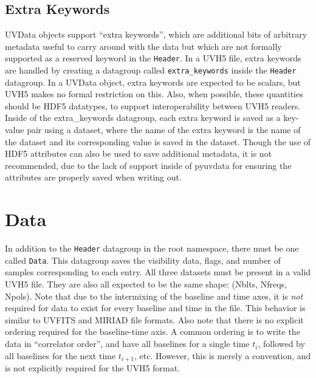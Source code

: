 \documentclass[11pt, oneside]{article}
\begin{document}
\subsection{Extra Keywords}
\label{sec:extra_keywords}
UVData objects support ``extra keywords'', which are additional bits of
arbitrary metadata useful to carry around with the data but which are not
formally supported as a reserved keyword in the \verb+Header+. In a UVH5 file,
extra keywords are handled by creating a datagroup called \verb+extra_keywords+
inside the \verb+Header+ datagroup. In a UVData object, extra keywords are
expected to be scalars, but UVH5 makes no formal restriction on this. Also, when
possible, these quantities should be HDF5 datatypes, to support interoperability
between UVH5 readers. Inside of the extra\_keywords datagroup, each extra
keyword is saved as a key-value pair using a dataset, where the name of the
extra keyword is the name of the dataset and its corresponding value is saved in
the dataset. Though the use of HDF5 attributes can also be used to save
additional metadata, it is not recommended, due to the lack of support inside of
pyuvdata for ensuring the attributes are properly saved when writing out.


\section{Data}
\label{sec:data}
In addition to the \verb+Header+ datagroup in the root namespace, there must be
one called \verb+Data+. This datagroup saves the visibility data, flags, and
number of samples corresponding to each entry. All three datasets must be
present in a valid UVH5 file. They are also all expected to be the same shape:
(Nblts, Nfreqs, Npols). Note that due to the intermixing of the baseline and
time axes, it is \textit{not} required for data to exist for every baseline and
time in the file. This behavior is similar to UVFITS and MIRIAD file
formats. Also note that there is no explicit ordering required for the
baseline-time axis. A common ordering is to write the data in ``correlator
order'', and have all baselines for a single time $t_i$, followed by all
baselines for the next time $t_{i+1}$, etc. However, this is merely a
convention, and is not explicitly required for the UVH5 format.
\end{document}
